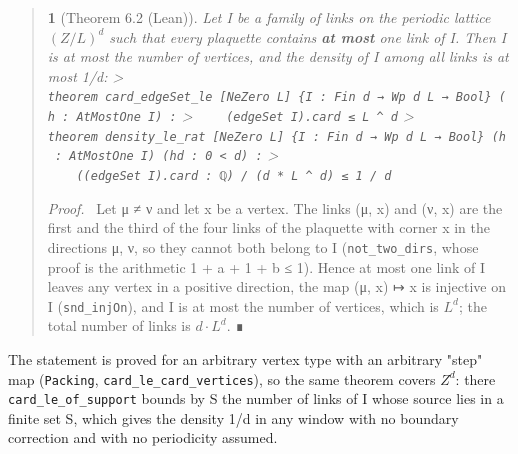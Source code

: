 \documentclass[11pt,a4paper]{article}
\theoremstyle{named}
\newtheorem*{namedthm}{}
\newenvironment{mdproof}[1][Proof]{\par\medskip\noindent\textit{#1.}\ }{\par\medskip}
\begin{document}
\begin{quote}
\begin{namedthm}[Theorem 6.2 (Lean)]
Let I be a family of links on the periodic lattice $(Z/L)^d$ such that every plaquette contains \textbf{at most} one link of I. Then \textbar{}I\textbar{} is at most the number of vertices, and the density of I among all links is at most 1/d: \textgreater{} \texttt{theorem\ \allowbreak{}card\_\allowbreak{}edgeSet\_\allowbreak{}le\ \allowbreak{}[NeZero\ \allowbreak{}L]\ \allowbreak{}\{I\ \allowbreak{}:\ \allowbreak{}Fin\ \allowbreak{}d\ \allowbreak{}→\ \allowbreak{}Wp\ \allowbreak{}d\ \allowbreak{}L\ \allowbreak{}→\ \allowbreak{}Bool\}\ \allowbreak{}(h\ \allowbreak{}:\ \allowbreak{}AtMostOne\ \allowbreak{}I)\ \allowbreak{}:} \textgreater{} \texttt{\ \allowbreak{}\ \allowbreak{}\ \allowbreak{}\ \allowbreak{}(edgeSet\ \allowbreak{}I).\allowbreak{}card\ \allowbreak{}≤\ \allowbreak{}L\ \allowbreak{}\textasciicircum{}\ \allowbreak{}d} \textgreater{} \texttt{theorem\ \allowbreak{}density\_\allowbreak{}le\_\allowbreak{}rat\ \allowbreak{}[NeZero\ \allowbreak{}L]\ \allowbreak{}\{I\ \allowbreak{}:\ \allowbreak{}Fin\ \allowbreak{}d\ \allowbreak{}→\ \allowbreak{}Wp\ \allowbreak{}d\ \allowbreak{}L\ \allowbreak{}→\ \allowbreak{}Bool\}\ \allowbreak{}(h\ \allowbreak{}:\ \allowbreak{}AtMostOne\ \allowbreak{}I)\ \allowbreak{}(hd\ \allowbreak{}:\ \allowbreak{}0\ \allowbreak{}\textless{}\ \allowbreak{}d)\ \allowbreak{}:} \textgreater{} \texttt{\ \allowbreak{}\ \allowbreak{}\ \allowbreak{}\ \allowbreak{}((edgeSet\ \allowbreak{}I).\allowbreak{}card\ \allowbreak{}:\ \allowbreak{}ℚ)\ \allowbreak{}/\ \allowbreak{}(d\ \allowbreak{}*\ \allowbreak{}L\ \allowbreak{}\textasciicircum{}\ \allowbreak{}d)\ \allowbreak{}≤\ \allowbreak{}1\ \allowbreak{}/\ \allowbreak{}d}
\end{namedthm}
\begin{mdproof}[Proof]
Let μ ≠ ν and let x be a vertex. The links (μ, x) and (ν, x) are the first and the third of the four links of the plaquette with corner x in the directions μ, ν, so they cannot both belong to I (\texttt{not\_\allowbreak{}two\_\allowbreak{}dirs}, whose proof is the arithmetic 1 + a + 1 + b ≤ 1). Hence at most one link of I leaves any vertex in a positive direction, the map (μ, x) ↦ x is injective on I (\texttt{snd\_\allowbreak{}injOn}), and \textbar{}I\textbar{} is at most the number of vertices, which is $L^d$; the total number of links is $d·L^d$. ∎
\end{mdproof}
\end{quote}
The statement is proved for an arbitrary vertex type with an arbitrary "step" map (\texttt{Packing}, \texttt{card\_\allowbreak{}le\_\allowbreak{}card\_\allowbreak{}vertices}), so the same theorem covers $Z^d$: there \texttt{card\_\allowbreak{}le\_\allowbreak{}of\_\allowbreak{}support} bounds by \textbar{}S\textbar{} the number of links of I whose source lies in a finite set S, which gives the density 1/d in any window with no boundary correction and with no periodicity assumed.
\end{document}
